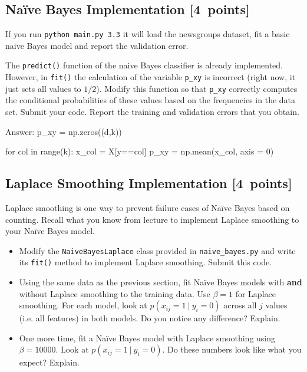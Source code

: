 \documentclass{article}
\newcommand{\blu}[1]{{\textcolor{blu}{#1}}}
\newcommand{\gre}[1]{\textcolor{gre}{#1}}
\newcommand\ans[1]{\par\gre{Answer: #1}}
\let\ask\blu
\newcommand\pts[1]{\textcolor{pointscolour}{[#1~points]}}
\begin{document}
    \clearpage
    \subsection{Na\"ive Bayes Implementation \pts{4}}

    If you run \texttt{python main.py 3.3}
    it will load the newsgroups dataset, fit a basic naive Bayes model and report the validation error.

    The \texttt{predict()} function of the naive Bayes classifier is already implemented.
    However, in \texttt{fit()}
    the calculation of the variable \texttt{p\_xy} is incorrect
    (right now, it just sets all values to $1/2$).
    \ask{Modify this function so that \texttt{p\_xy} correctly
        computes the conditional probabilities of these values based on the
        frequencies in the data set. Submit your code. Report the training and validation errors that you obtain.}

    \ans{
        p_xy = np.zeros((d,k))

        for col in range(k):
            x_col = X[y==col]
            p_xy = np.mean(x_col, axis = 0)
    }

    \clearpage
    \subsection{Laplace Smoothing Implementation \pts{4}}

    Laplace smoothing is one way to prevent failure cases of Na\"ive Bayes based on counting. Recall what you know from lecture to implement Laplace smoothing to your Na\"ive Bayes model.
    \begin{itemize}
        \item Modify the \texttt{NaiveBayesLaplace} class provided in \texttt{naive\_bayes.py} and write its \texttt{fit()} method to implement Laplace smoothing. \ask{Submit this code.}

        \item Using the same data as the previous section, fit Na\"ive Bayes models with \textbf{and} without Laplace smoothing to the training data. Use $\beta=1$ for Laplace smoothing. For each model, look at $p(x_{ij} = 1 \ | \ y_i = 0)$ across all $j$ values (i.e. all features) in both models. \ask{Do you notice any difference? Explain.}
        \item One more time, fit a Na\"ive Bayes model with Laplace smoothing using $\beta=10000$. Look at $p(x_{ij} = 1 \ | \ y_i = 0)$. \ask{Do these numbers look like what you expect? Explain.}
    \end{itemize}
\end{document}
